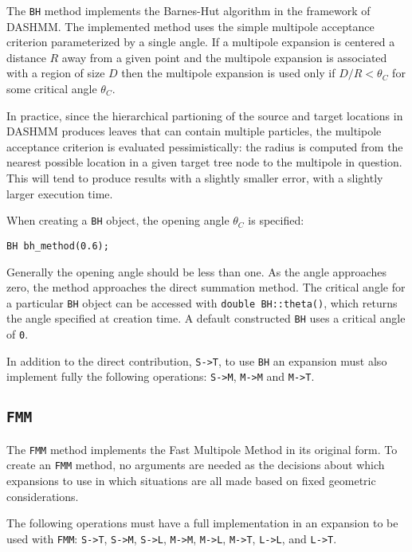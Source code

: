 The {\tt BH} method implements the Barnes-Hut algorithm in the framework of
DASHMM. The implemented method uses the simple multipole acceptance criterion
parameterized by a single angle. If a multipole expansion is centered a
distance $R$ away from a given point and the multipole expansion is
associated with a region of size $D$ then the multipole expansion is used
only if $D/R < \theta_C$ for some critical angle $\theta_C$.

In practice, since the
hierarchical partioning of the source and target locations in DASHMM produces
leaves that can contain multiple particles, the multipole acceptance criterion
is evaluated pessimistically: the radius is computed from the nearest possible
location in a given target tree node to the multipole in question. This will
tend to produce results with a slightly smaller error, with a slightly larger
execution time.

When creating a {\tt BH} object, the opening angle $\theta_C$ is specified:

\begin{verbatim}
BH bh_method(0.6);
\end{verbatim}

\noindent Generally the opening angle should be less than one. As the
angle approaches
zero, the method approaches the direct summation method. The critical angle
for a particular {\tt BH} object can be accessed with {\tt double BH::theta()},
which returns the angle specified at creation time. A default constructed
{\tt BH} uses a critical angle of {\tt 0}.

In addition to the direct contribution, {\tt S->T}, to use {\tt BH} an expansion
must also implement fully the following operations: {\tt S->M}, {\tt M->M}
and {\tt M->T}.

\subsection{{\tt FMM}}

The {\tt FMM} method implements the Fast Multipole Method in its original form.
To create an {\tt FMM} method, no arguments are needed as the decisions about
which expansions to use in which situations are all made based on fixed
geometric considerations.

The following operations must have a full implementation in an expansion to be
used with {\tt FMM}: {\tt S->T}, {\tt S->M}, {\tt S->L}, {\tt M->M},
{\tt M->L}, {\tt M->T}, {\tt L->L}, and {\tt L->T}.


